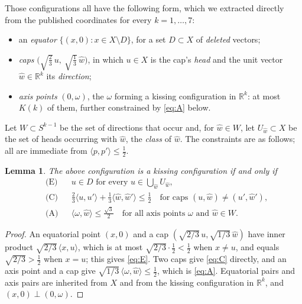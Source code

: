 \documentclass[11pt]{amsart}
\newtheorem{lemma}[theorem]{Lemma}
\theoremstyle{remark}
\newcommand{\ip}[2]{\langle #1,#2\rangle}
\newcommand{\wh}{\widehat{w}}
\begin{document}
Those configurations all have the following form, which we extracted directly
from the published coordinates \cite{cohn-data} for every $k=1,\dots,7$:

\begin{itemize}
\item an \emph{equator} $\{(x,0):x\in X\setminus D\}$, for a set $D\subset X$
      of \emph{deleted} vectors;
\item \emph{caps} $\bigl(\sqrt{\tfrac23}\,u,\ \sqrt{\tfrac13}\,\wh\bigr)$, in
      which $u\in X$ is the cap's \emph{head} and the unit vector
      $\wh\in\mathbb{R}^{k}$ its \emph{direction};
\item \emph{axis points} $(0,\omega)$, the $\omega$ forming a kissing
      configuration in $\mathbb{R}^{k}$: at most $K(k)$ of them, further
      constrained by \eqref{eq:A} below.
\end{itemize}

Let $W\subset S^{k-1}$ be the set of directions that occur and, for $\wh\in W$,
let $U_{\wh}\subset X$ be the set of heads occurring with $\wh$, the
\emph{class} of $\wh$. The constraints are as follows; all are immediate from
$\ip{p}{p'}\le\tfrac12$.

\begin{lemma}\label{lem:constraints}
The above configuration is a kissing configuration if and only if
\begin{align}
&\text{(E)} && u\in D \text{ for every } u\in\textstyle\bigcup_{\wh}U_{\wh},
   \label{eq:E}\\
&\text{(C)} && \tfrac23\ip{u}{u'}+\tfrac13\ip{\wh}{\wh{}'}\le\tfrac12
   \quad\text{for caps } (u,\wh)\ne(u',\wh{}'),\label{eq:C}\\
&\text{(A)} && \ip{\omega}{\wh}\le\tfrac{\sqrt3}{2}\quad\text{for all
   axis points }\omega\text{ and }\wh\in W.\label{eq:A}
\end{align}
\end{lemma}

\begin{proof}
An equatorial point $(x,0)$ and a cap $(\sqrt{2/3}\,u,\sqrt{1/3}\,\wh)$ have
inner product $\sqrt{2/3}\,\ip{x}{u}$, which is at most
$\sqrt{2/3}\cdot\tfrac12<\tfrac12$ when $x\ne u$, and equals
$\sqrt{2/3}>\tfrac12$ when $x=u$; this gives \eqref{eq:E}. Two caps give
\eqref{eq:C} directly, and an axis point and a cap give
$\sqrt{1/3}\,\ip{\omega}{\wh}\le\tfrac12$, which is \eqref{eq:A}. Equatorial
pairs and axis pairs are inherited from $X$ and from the kissing configuration
in $\mathbb{R}^{k}$, and $(x,0)\perp(0,\omega)$.
\end{proof}
\end{document}
